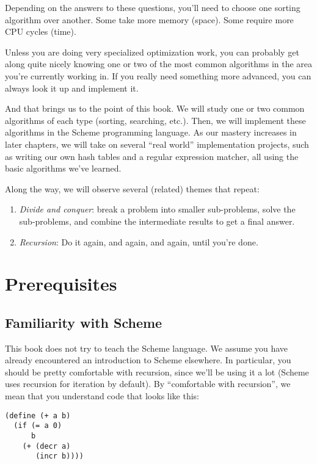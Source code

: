 \documentclass[12pt,openright,draft]{book}
\begin{document}
Depending on the answers to these questions, you'll need to choose one
sorting algorithm over another.  Some take more memory (space).  Some
require more CPU cycles (time).

Unless you are doing very specialized optimization work, you can
probably get along quite nicely knowing one or two of the most common
algorithms in the area you're currently working in.  If you really
need something more advanced, you can always look it up and implement
it.

And that brings us to the point of this book.  We will study one or
two common algorithms of each type (sorting, searching, etc.).  Then,
we will implement these algorithms in the Scheme programming language.
As our mastery increases in later chapters, we will take on several
``real world'' implementation projects, such as writing our own hash
tables and a regular expression matcher, all using the basic
algorithms we've learned.

Along the way, we will observe several (related) themes that repeat:

\begin{enumerate}
\item \emph{Divide and conquer}: break a problem into smaller
  sub-problems, solve the sub-problems, and combine the intermediate
  results to get a final answer.
\item \emph{Recursion}: Do it again, and again, and again, until
  you're done.
\end{enumerate}

\chapter{Prerequisites}

\section{Familiarity with Scheme}

This book does not try to teach the Scheme language.  We assume you
have already encountered an introduction to Scheme elsewhere. In
particular, you should be pretty comfortable with recursion, since
we'll be using it a lot (Scheme uses recursion for iteration by
default).  By ``comfortable with recursion'', we mean that you
understand code that looks like this:

\begin{verbatim}
(define (+ a b)
  (if (= a 0)
      b
    (+ (decr a)
       (incr b))))
\end{verbatim}
\end{document}
